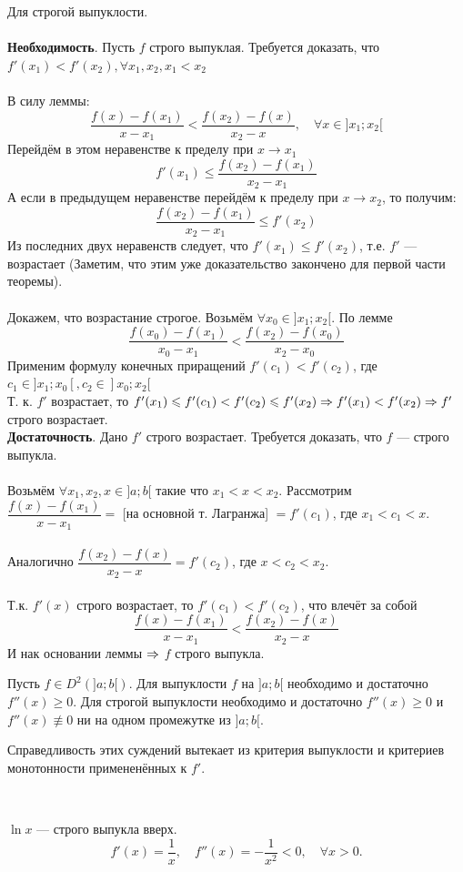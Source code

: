 \begin{Proof} Для строгой выпуклости.\\\\
	\textbf{Необходимость}. Пусть $f$ строго выпуклая. Требуется доказать, что $f'(x_{1}) < f'(x_{2}), \forall x_{1}, x_{2}, x_{1} < x_{2}$ \\\\
	В силу леммы: 
	$$\frac{f(x) - f(x_{1})}{x - x_{1}} < \frac{f(x_{2}) - f(x)}{x_{2} - x},\quad \forall x \in ]x_{1};x_{2}[$$
	Перейдём в этом неравенстве к пределу при $x \xrightarrow{} x_{1}$
	$$f'(x_{1}) \leq \frac{f(x_{2}) - f(x_{1})}{x_{2} - x_{1}}$$
	А если в предыдущем неравенстве перейдём к пределу при $x \xrightarrow{} x_{2}$, то получим:
	$$\frac{f(x_{2}) - f(x_{1})}{x_{2} - x_{1}} \leq f'(x_{2})$$
	Из последних двух неравенств следует, что $f'(x_{1}) \leq f'(x_{2})$, т.е. $f'$ --- возрастает (Заметим, что этим уже доказательство закончено для первой части теоремы).\\\\
	Докажем, что возрастание строгое.
	Возьмём $\forall x_{0} \in ]x_{1}; x_{2}[$. По лемме
	$$\frac{f(x_{0}) - f(x_{1})}{x_{0} - x_{1}} < \frac{f(x_{2}) - f(x_{0})}{x_{2} - x_{0}}$$
	Применим формулу конечных приращений $f'(c_{1}) < f'(c_{2})$, где $c_{1} \in ]x_{1};x_{0}[, c_{2} \in ]x_{0};x_{2}[$ \\
	Т. к. $f'$ возрастает, то 
	$f'(x_{1}) \leqslant f'(c_{1}) < f'(c_{2}) \leqslant f'(x_{2}) \Rightarrow f'(x_{1}) < f'(x_{2}) \Rightarrow f'$ строго возрастает. \\
	\textbf{Достаточность}. Дано $f'$ строго возрастает. Требуется доказать, что $f$ --- строго выпукла. \\\\
	Возьмём $\forall x_{1}, x_{2}, x \in ]a;b[$ такие что $x_{1} < x < x_{2}$.
	Рассмотрим $\dfrac{f(x) - f(x_{1})}{x - x_{1}} = $ [на основной т. Лагранжа] $= f'(c_{1})$, где $x_{1} < c_{1} < x$.\\\\
	Аналогично $\dfrac{f(x_{2}) - f(x)}{x_{2} - x} = f'(c_{2})$, где $x < c_{2} < x_{2}$.\\\\
	Т.к. $f'(x)$ строго возрастает, то $f'(c_{1}) < f'(c_{2})$, что влечёт за собой 
	$$\frac{f(x) - f(x_{1})}{x - x_{1}} < \frac{f(x_{2}) - f(x)}{x_{2} - x}$$
	И нак основании леммы $\Rightarrow$ $f$ строго выпукла.
\end{Proof}
\begin{cor}
	Пусть $f \in D^2(]a;b[)$. Для выпуклости $f$ на  $]a;b[$ необходимо и достаточно $f''(x) \geq 0$. Для строгой выпуклости необходимо и достаточно $f''(x) \geq 0$ и $f''(x) \not\equiv 0$ ни на одном промежутке из $]a;b[$.
\end{cor}
\begin{Proof}
	Справедливость этих суждений вытекает из критерия выпуклости и критериев монотонности примененённых к $f'$.
\end{Proof}\\
\begin{example}
	$\ln x$ --- строго выпукла вверх.
	$$f'(x) = \frac{1}{x},\quad f''(x) = - \frac{1}{x^2} < 0,\quad \forall x > 0.$$
\end{example}
